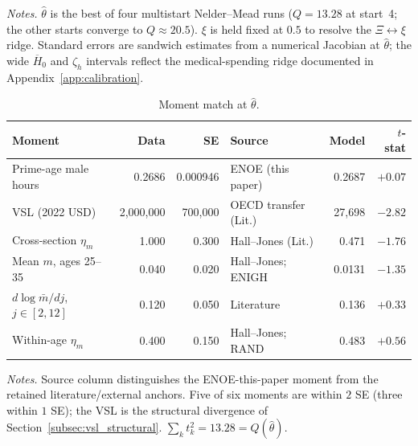 \documentclass[12pt,a4paper]{article}
\begin{document}
\begin{appendices}
\begin{table}[H]
\vspace{0.5em}
\begin{minipage}{0.92\textwidth}
\footnotesize \textit{Notes.} $\widehat\theta$ is the best of four multistart Nelder--Mead runs ($Q=13.28$ at start~4; the other starts converge to $Q\approx 20.5$). $\xi$ is held fixed at $0.5$ to resolve the $\Xi\leftrightarrow\xi$ ridge. Standard errors are sandwich estimates from a numerical Jacobian at $\widehat\theta$; the wide $\overline{H}_0$ and $\zeta_h$ intervals reflect the medical-spending ridge documented in Appendix~\ref{app:calibration}.
\end{minipage}
\end{table}

\begin{table}[H]
\centering
\caption{Moment match at $\widehat\theta$.}
\label{tab:moment_match}
\begin{tabular}{lrrlrr}
\toprule
Moment                         & Data         & SE        & Source                & Model     & $t$-stat \\
\midrule
Prime-age male hours           & 0.2686       & 0.000946  & ENOE (this paper)     & 0.2687    & $+0.07$  \\
VSL (2022 USD)                 & 2{,}000{,}000 & 700{,}000 & OECD transfer (Lit.)  & 27{,}698  & $-2.82$  \\
Cross-section $\eta_m$         & 1.000        & 0.300     & Hall--Jones (Lit.)    & 0.471     & $-1.76$  \\
Mean $m$, ages 25--35          & 0.040        & 0.020     & Hall--Jones; ENIGH    & 0.0131    & $-1.35$  \\
$d\log\bar m/dj$, $j\in[2,12]$ & 0.120        & 0.050     & Literature            & 0.136     & $+0.33$  \\
Within-age $\eta_m$            & 0.400        & 0.150     & Hall--Jones; RAND     & 0.483     & $+0.56$  \\
\bottomrule
\end{tabular}

\vspace{0.5em}
\begin{minipage}{0.92\textwidth}
\footnotesize \textit{Notes.} Source column distinguishes the ENOE-this-paper moment from the retained literature/external anchors. Five of six moments are within $2$ SE (three within $1$ SE); the VSL is the structural divergence of Section~\ref{subsec:vsl_structural}. $\sum_k t_k^2 = 13.28 = Q(\widehat\theta)$.
\end{minipage}
\end{table}


\end{appendices}
\end{document}
